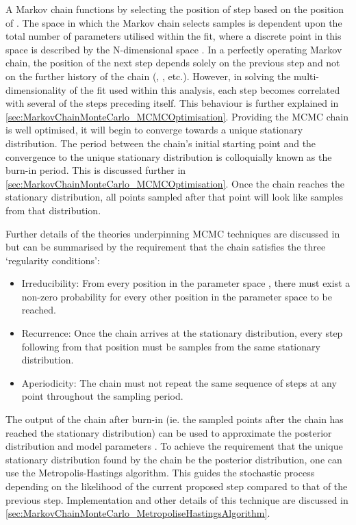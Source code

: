 A Markov chain functions by selecting the position of step  based on the position of . The space in which the Markov chain selects samples is dependent upon the total number of parameters utilised within the fit, where a discrete point in this space is described by the N-dimensional space . In a perfectly operating Markov chain, the position of the next step depends solely on the previous step and not on the further history of the chain (, , etc.). However, in solving the multi-dimensionality of the fit used within this analysis, each step becomes correlated with several of the steps preceding itself. This behaviour is further explained in \autoref{sec:MarkovChainMonteCarlo_MCMCOptimisation}. Providing the MCMC chain is well optimised, it will begin to converge towards a unique stationary distribution. The period between the chain's initial starting point and the convergence to the unique stationary distribution is colloquially known as the burn-in period. This is discussed further in \autoref{sec:MarkovChainMonteCarlo_MCMCOptimisation}. Once the chain reaches the stationary distribution, all points sampled after that point will look like samples from that distribution.

Further details of the theories underpinning MCMC techniques are discussed in \cite{mcmc_practice} but can be summarised by the requirement that the chain satisfies the three `regularity conditions':

\begin{itemize}
\item Irreducibility: From every position in the parameter space , there must exist a non-zero probability for every other position in the parameter space to be reached.
\item Recurrence: Once the chain arrives at the stationary distribution, every step following from that position must be samples from the same stationary distribution.
\item Aperiodicity: The chain must not repeat the same sequence of steps at any point throughout the sampling period.
\end{itemize}

The output of the chain after burn-in (ie. the sampled points after the chain has reached the stationary distribution) can be used to approximate the posterior distribution and model parameters \quickmath{\vec{\theta}}. To achieve the requirement that the unique stationary distribution found by the chain be the posterior distribution, one can use the Metropolis-Hastings algorithm. This guides the stochastic process depending on the likelihood of the current proposed step compared to that of the previous step. Implementation and other details of this technique are discussed in \autoref{sec:MarkovChainMonteCarlo_MetropoliseHastingsAlgorithm}.


